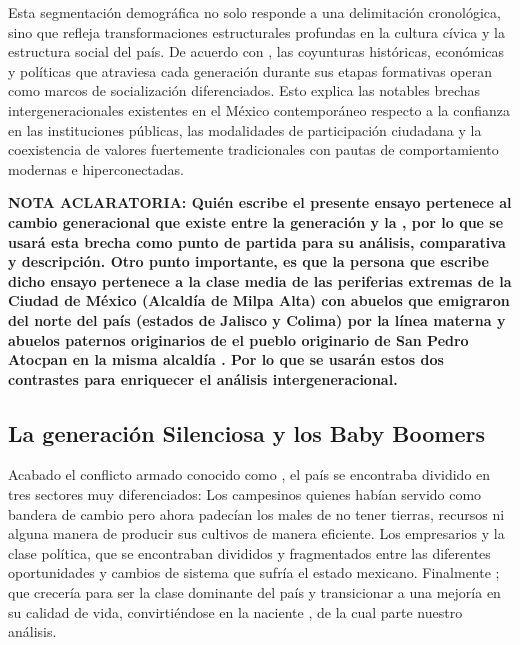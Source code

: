Esta segmentación demográfica no solo responde a una delimitación cronológica, sino que refleja transformaciones
estructurales profundas en la cultura cívica y la estructura social del país. De acuerdo con
\cite{moreno2011generaciones}, las coyunturas históricas, económicas y políticas que atraviesa cada generación
durante sus etapas formativas operan como marcos de socialización diferenciados. Esto explica las
notables brechas intergeneracionales existentes en el México contemporáneo respecto a la confianza en las
instituciones públicas, las modalidades de participación ciudadana y la coexistencia de valores fuertemente
tradicionales con pautas de comportamiento modernas e hiperconectadas.

\textbf{NOTA ACLARATORIA: Quién escribe el presente ensayo pertenece al cambio generacional que existe entre
la generación  y la , por lo que se usará esta brecha como punto de partida
para su análisis, comparativa y descripción. Otro punto importante, es que la persona que escribe dicho ensayo
pertenece a la clase media de las periferias extremas de la Ciudad de México (Alcaldía de Milpa Alta) con abuelos
que emigraron del norte del país (estados de Jalisco y Colima) por la línea materna y abuelos paternos originarios de el
pueblo originario de San Pedro Atocpan en la misma alcaldía . Por lo que se usarán
estos dos contrastes para enriquecer el análisis intergeneracional.}

\subsection{La generación Silenciosa y los Baby Boomers}
\label{ssec:generacion-silenciosa-boomers}

Acabado el conflicto armado conocido como , el país se encontraba dividido
en tres sectores muy diferenciados: Los campesinos quienes habían servido como bandera de cambio pero
ahora padecían los males de no tener tierras, recursos ni alguna manera de producir sus cultivos de manera
eficiente. Los empresarios y la clase política, que se encontraban divididos y fragmentados entre las diferentes
oportunidades y cambios de sistema que sufría el estado mexicano. Finalmente ; que
crecería para ser la clase dominante del país y transicionar a una mejoría en su calidad de vida, convirtiéndose
en la naciente , de la cual parte nuestro análisis.


